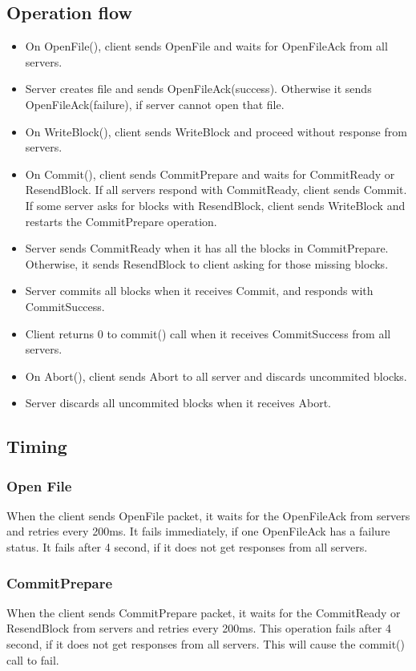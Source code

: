 \documentclass[11pt]{article} %
\begin{document}
\subsection{Operation flow}
\begin{itemize}
    \item On OpenFile(), client sends OpenFile and waits for OpenFileAck from all servers.
    \item Server creates file and sends OpenFileAck(success). 
        Otherwise it sends OpenFileAck(failure), if server cannot open that file.
    \item On WriteBlock(), client sends WriteBlock and proceed without response from servers.
    \item On Commit(), client sends CommitPrepare and waits for CommitReady or ResendBlock.
        If all servers respond with CommitReady, client sends Commit.
        If some server asks for blocks with ResendBlock, client sends WriteBlock
        and restarts the CommitPrepare operation.
    \item Server sends CommitReady when it has all the blocks in CommitPrepare.
        Otherwise, it sends ResendBlock to client asking for those missing blocks.
    \item Server commits all blocks when it receives Commit, 
        and responds with CommitSuccess.
    \item Client returns 0 to commit() call when it receives CommitSuccess from all servers.\
    \item On Abort(), client sends Abort to all server and discards uncommited blocks.
    \item Server discards all uncommited blocks when it receives Abort.
\end{itemize}

\subsection{Timing}
\subsubsection{Open File}
When the client sends OpenFile packet, it waits for the OpenFileAck from servers 
and retries every 200ms.
It fails immediately, if one OpenFileAck has a failure status. 
It fails after 4 second, if it does not get responses from all servers.

\subsubsection{CommitPrepare}
When the client sends CommitPrepare packet, it waits for the CommitReady 
or ResendBlock from servers and retries every 200ms.
This operation fails after 4 second, if it does not get responses from all servers.
This will cause the commit() call to fail.
\end{document}
